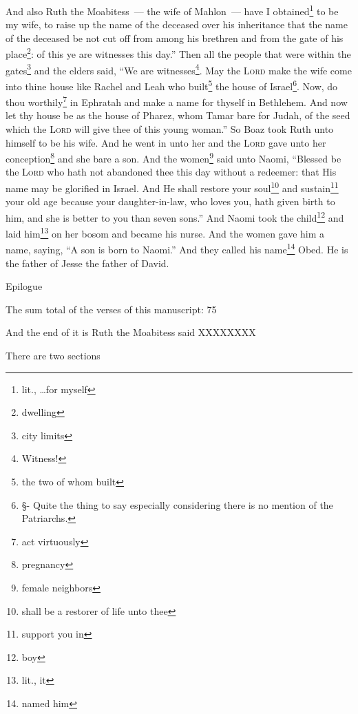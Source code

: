 \begin{enumerate*}[mode=unboxed]
     And also Ruth the Moabitess~--- the wife of Mahlon~--- have I obtained\footnote{lit., \dots for myself} to be my wife, to raise up the name of the deceased over his inheritance that the name of the deceased be not cut off from among his brethren and from the gate of his place\footnote{dwelling}: of this ye are witnesses this day.''%
     Then all the people that were within the gates\footnote{city limits} and the elders said, ``We are witnesses\footnote{Witness!}. May the \textsc{Lord} make the wife come into thine house like Rachel and Leah who built\footnote{the two of whom built} the house of Israel\footnote{\S - Quite the thing to say especially considering there is no mention of the Patriarchs.}. Now, do thou worthily\footnote{act virtuously} in Ephratah and make a name for thyself in Bethlehem.%
     And now let thy house be as the house of Pharez, whom Tamar bare for Judah, of the seed which the \textsc{Lord} will give thee of this young woman.''%
     So Boaz took Ruth unto himself to be his wife. And he went in unto her and the \textsc{Lord} gave unto her conception\footnote{pregnancy} and she bare a son.%
     And the women\footnote{female neighbors} said unto Naomi, ``Blessed be the \textsc{Lord} who hath not abandoned thee this day without a redeemer: that His name may be glorified in Israel.%
     And He shall restore your soul\footnote{shall be a restorer of life unto thee} and sustain\footnote{support you in} your old age because your daughter-in-law, who loves you, hath given birth to him, and she is better to you than seven sons.''%
     And Naomi took the child\footnote{boy} and laid him\footnote{lit., it} on her bosom and became his nurse.%
     And the women gave him a name, saying, ``A son is born to Naomi.'' And they called his name\footnote{named him} Obed. He is the father of Jesse the father of David.%
\end{enumerate*}

Epilogue

The sum total of the verses of this manuscript: 75

And the end of it is Ruth the Moabitess said XXXXXXXX

There are two sections
